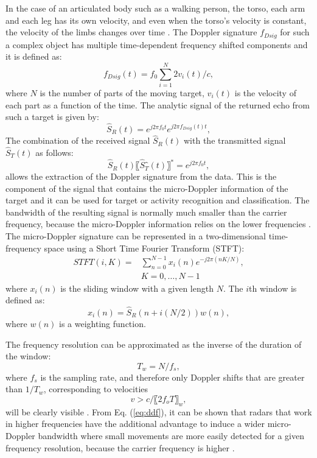 In the case of an articulated body such as a walking person, the torso, each arm and each leg has its own velocity, and even when the torso's velocity is constant, the velocity of the limbs changes over time \cite{zhang2007acoustic}. The Doppler signature $f_{Dsig}$ for such a complex object has multiple time-dependent frequency shifted components and it is defined as:
\begin{equation}
f_{Dsig} (t)=f_0\sum_{i=1}^{N}2v_i (t)/c,
\end{equation}
where $N$ is the number of parts of the moving target, $v_i (t)$ is the velocity of each part as a function of the time. The analytic signal of the returned echo from such a target is given by: 
\begin{equation}
\hat{S}_R (t)=e^{j2 \pi f_0 t} e^{j2\pi f_{Dsig} (t)t},
\end{equation}
The combination of the received signal $\hat{S}_R (t)$ with the transmitted signal $\hat{S}_T (t)$ as follows:
\begin{equation}
\hat{S}_R (t) 〖\hat{S}_T ̂(t)〗^*=e^{j2\pi f_0 t},
\end{equation}
allows the extraction of the Doppler signature from the data. This is the component of the signal that contains the micro-Doppler information of the target and it can be used for target or activity recognition and classification. The bandwidth of the resulting signal is normally much smaller than the carrier frequency,  because the micro-Doppler information relies on the lower frequencies \cite{balleri2011classification}. The micro-Doppler signature can be represented in a two-dimensional time-frequency space using a Short Time Fourier Transform (STFT):  
\begin{equation}
\begin{split}
STFT(i,K)=&\sum_{n=0}^{N-1} x_i (n) e^{-j2\pi(nK/N) },\\& K=0,\ldots ,N-1
\end{split}
\end{equation}
where $x_i (n)$ is the sliding window with a given length $N$. The $i$th window is defined as:
\begin{equation}
x_i (n)=\hat{S}_R (n+i(N/2))w(n),
\end{equation}
where $w(n)$ is a weighting function.

The frequency resolution can be approximated as the inverse of the duration of the window:
\begin{equation}
T_w=N/f_s,
\end{equation}
where $f_s$ is the sampling rate, and therefore only Doppler shifts that are greater than $1/T_w$, corresponding to velocities
\begin{equation}\label{eq:ddf}
v>c/〖2f_o T〗_w,
\end{equation}
will be clearly visible \cite{balleri2011classification}. From Eq. (\ref{eq:ddf}), it can be shown that radars that work in higher frequencies have the additional advantage to induce a wider micro-Doppler bandwidth where small movements are more easily detected for a given frequency resolution, because the carrier frequency is higher \cite{balleri2011classification}.

